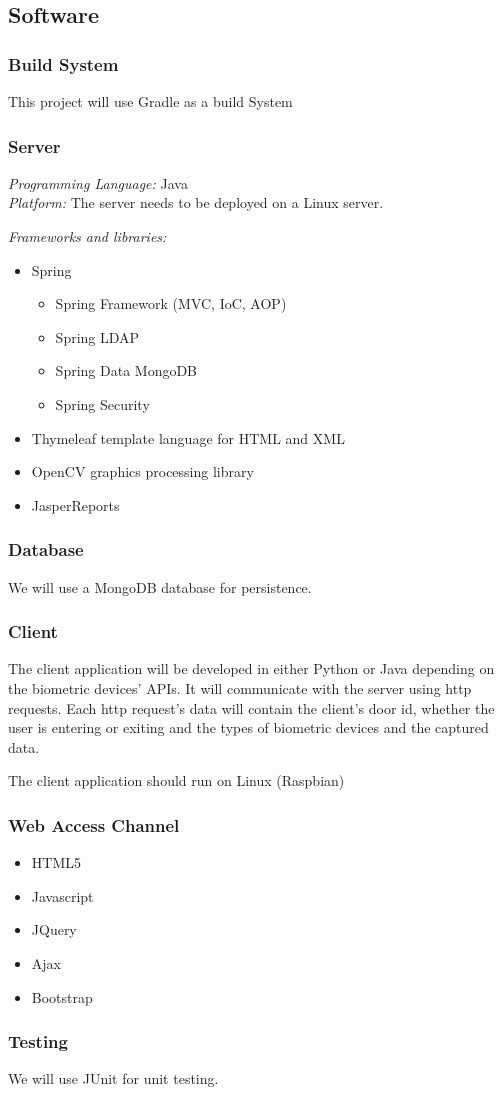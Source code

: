 \subsection{Software}

\subsubsection{Build System}
This project will use Gradle as a build System

\subsubsection{Server}
\textit{Programming Language:} Java \\
\textit{Platform:} The server needs to be deployed on a Linux server.

\textit{Frameworks and libraries:}
\begin{itemize}
	\item Spring
		\begin{itemize}
			\item Spring Framework (MVC, IoC, AOP)
			\item Spring LDAP
			\item Spring Data MongoDB
			\item Spring Security
		\end{itemize}
	\item Thymeleaf template language for HTML and XML
	\item OpenCV graphics processing library
	\item JasperReports
\end{itemize}

\subsubsection{Database}
We will use a MongoDB database for persistence.

\subsubsection{Client}
The client application will be developed in either Python or Java depending on the biometric devices' APIs. It will communicate with the server using http requests. Each http request's data will contain the client's door id, whether the user is entering or exiting and the types of biometric devices and the captured data. 

The client application should run on Linux (Raspbian)

\subsubsection{Web Access Channel}
\begin{itemize}
	\item HTML5
	\item Javascript
	\item JQuery
	\item Ajax
	\item Bootstrap
\end{itemize}

\subsubsection{Testing}
We will use JUnit for unit testing.